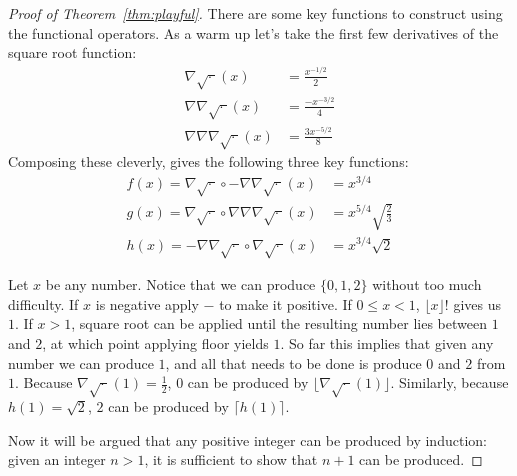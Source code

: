 \documentclass[10pt]{article}
\begin{document}
\begin{proof}[Proof of Theorem~\ref{thm:playful}]
	There are some key functions to construct using the functional operators.  As a warm up let's take the first few derivatives of the square root function:
	\begin{align*}
		\nabla \sqrt{\cdot\ } (x) &= \frac{x^{-1/2}}{2}\\
		\nabla \nabla \sqrt{\cdot\ } (x) &= \frac{-x^{-3/2}}{4}\\
		\nabla \nabla \nabla \sqrt{\cdot\ } (x) &= \frac{3x^{-5/2}}{8}
	\end{align*}
	Composing these cleverly, gives the following three key functions:
	\begin{align*}
		f(x) = \nabla \sqrt{\cdot\ } \circ - \nabla \nabla \sqrt{\cdot\ }(x) &= x^{3/4}\\
		g(x) = \nabla \sqrt{\cdot\ } \circ \nabla \nabla \nabla \sqrt{\cdot\ }(x) &=  x^{5/4} \sqrt{\frac{2}{3}}\\
		h(x) = -\nabla \nabla \sqrt{\cdot\ } \circ \nabla \sqrt{\cdot\ }(x) &= x^{3/4}\sqrt{2}
	\end{align*}
	
	Let $x$ be any number.
	Notice that we can produce $\{0,1,2\}$ without too much difficulty.  If $x$ is negative apply $-$ to make it positive.  If $0 \le x < 1$,  $\lfloor x \rfloor!$ gives us $1$.  If $x > 1$, square root can be applied until the resulting number lies between $1$ and $2$, at which point applying floor yields $1$.  So far this implies that given any number we can produce $1$, and all that needs to be done is produce $0$ and $2$ from $1$.
	Because $\nabla\sqrt{\cdot\ }(1) = \frac{1}{2}$, $0$ can be produced by $\lfloor \nabla\sqrt{\cdot\ }(1) \rfloor$.  Similarly, because $h(1) = \sqrt{2}$, $2$ can be produced by $\lceil h(1) \rceil$.
	
	Now it will be argued that any positive integer can be produced by induction: given an integer $n > 1$, it is sufficient to show that $n+1$ can be produced.
	

\end{proof}
\end{document}
